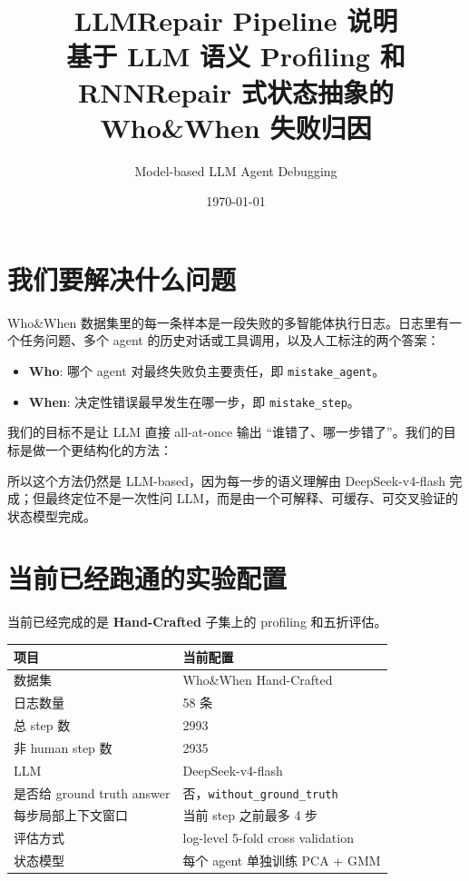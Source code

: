 \documentclass[UTF8,a4paper,11pt]{ctexart}
\title{\textbf{LLMRepair Pipeline 说明}\\
\large 基于 LLM 语义 Profiling 和 RNNRepair 式状态抽象的 Who\&When 失败归因}
\author{Model-based LLM Agent Debugging}
\date{\today}
\begin{document}
\maketitle

\section{我们要解决什么问题}

Who\&When 数据集里的每一条样本是一段失败的多智能体执行日志。日志里有一个任务问题、多个 agent 的历史对话或工具调用，以及人工标注的两个答案：

\begin{itemize}
  \item \textbf{Who}: 哪个 agent 对最终失败负主要责任，即 \texttt{mistake\_agent}。
  \item \textbf{When}: 决定性错误最早发生在哪一步，即 \texttt{mistake\_step}。
\end{itemize}

我们的目标不是让 LLM 直接 all-at-once 输出 ``谁错了、哪一步错了''。我们的目标是做一个更结构化的方法：

\begin{center}
\end{center}

所以这个方法仍然是 LLM-based，因为每一步的语义理解由 DeepSeek-v4-flash 完成；但最终定位不是一次性问 LLM，而是由一个可解释、可缓存、可交叉验证的状态模型完成。

\section{当前已经跑通的实验配置}

当前已经完成的是 \textbf{Hand-Crafted} 子集上的 profiling 和五折评估。

\begin{table}[htbp]
\centering
\begin{tabular}{ll}
\toprule
项目 & 当前配置 \\
\midrule
数据集 & Who\&When Hand-Crafted \\
日志数量 & 58 条 \\
总 step 数 & 2993 \\
非 human step 数 & 2935 \\
LLM & DeepSeek-v4-flash \\
是否给 ground truth answer & 否，\texttt{without\_ground\_truth} \\
每步局部上下文窗口 & 当前 step 之前最多 4 步 \\
评估方式 & log-level 5-fold cross validation \\
状态模型 & 每个 agent 单独训练 PCA + GMM \\
\bottomrule
\end{tabular}
\end{table}
\end{document}
